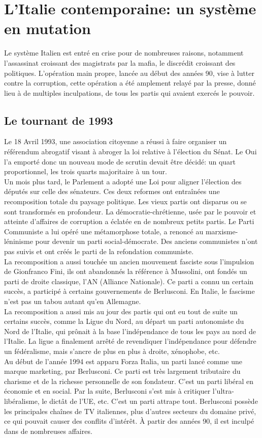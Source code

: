 \documentclass[10pt, a4paper, openany]{book}
\begin{document}
\section{L'Italie contemporaine: un système en mutation}

Le système Italien est entré en crise pour de nombreuses raisons, notamment l'assassinat croissant des magistrats par la mafia, le discrédit croissant des politiques. L'opération main propre, lancée au début des années 90, vise à lutter contre la corruption, cette opération a été amplement relayé par la presse, donné lieu à de multiples inculpations, de tous les partis qui avaient exercés le pouvoir. 

\subsection{Le tournant de 1993}

Le 18 Avril 1993, une association citoyenne a réussi à faire organiser un référendum abrogatif visant à abroger la loi relative à l'élection du Sénat. Le Oui l'a emporté donc un nouveau mode de scrutin devait être décidé: un quart proportionnel, les trois quarts majoritaire à un tour. \\
Un mois plus tard, le Parlement a adopté une Loi pour aligner l'élection des députés sur celle des sénateurs. Ces deux reformes ont entraînées une recomposition totale du paysage politique. Les vieux partis ont disparus ou se sont transformés en profondeur. La démocratie-chrétienne, usée par le pouvoir et atteinte d'affaires de corruption a éclatée en de nombreux petits partis. Le Parti Communiste a lui opéré une métamorphose totale, a renoncé au marxisme-léninisme pour devenir un parti social-démocrate. Des anciens communistes n'ont pas suivis et ont créés le parti de la refondation communiste. \\
La recomposition a aussi touchée un ancien mouvement fasciste sous l'impulsion de Gionfranco Fini, ils ont abandonnés la référence à Mussolini, ont fondés un parti de droite classique, l'AN (Alliance Nationale). Ce parti a connu un certain succès, a participé à certains gouvernements de Berlusconi. En Italie, le fascisme n'est pas un tabou autant qu'en Allemagne. \\
La recomposition a aussi mis au jour des partis qui ont eu tout de suite un certains succès, comme la Ligue du Nord, au départ un parti autonomiste du Nord de l'Italie, qui prônait à la base l'indépendance de tous les pays au nord de l'Italie. La ligue a finalement arrêté de revendiquer l'indépendance pour défendre un fédéralisme, mais s'ancre de plus en plus à droite, xénophobe, etc. \\
Au début de l'année 1994 est apparu Forza Italia, un parti lancé comme une marque marketing, par Berlusconi. Ce parti est très largement tributaire du charisme et de la richesse personnelle de son fondateur. C'est un parti libéral en économie et en social. Par la suite, Berlusconi s'est mis à critiquer l'ultra-libéralisme, le dictât de l'UE, etc. C'est un parti attrape tout. Berlusconi possède les principales chaînes de TV italiennes, plus d'autres secteurs du domaine privé, ce qui pouvait causer des conflits d'intérêt. À partir des années 90, il est inculpé dans de nombreuses affaires. 
\end{document}
